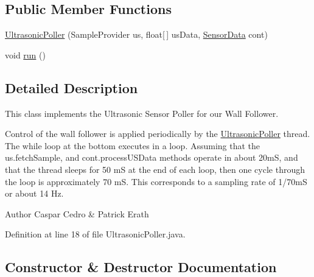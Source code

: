 \subsection*{Public Member Functions}
\begin{DoxyCompactItemize}
\item 
\hyperlink{classca_1_1mcgill_1_1ecse211_1_1sensors_1_1_ultrasonic_poller_a3007841893144cccb37d023f34fb3cfc}{Ultrasonic\+Poller} (Sample\+Provider us, float\mbox{[}$\,$\mbox{]} us\+Data, \hyperlink{classca_1_1mcgill_1_1ecse211_1_1sensors_1_1_sensor_data}{Sensor\+Data} cont)
\item 
void \hyperlink{classca_1_1mcgill_1_1ecse211_1_1sensors_1_1_ultrasonic_poller_acc71fac612a72c197244c71d6cf7b6e1}{run} ()
\end{DoxyCompactItemize}


\subsection{Detailed Description}
This class implements the Ultrasonic Sensor Poller for our Wall Follower.

Control of the wall follower is applied periodically by the \hyperlink{classca_1_1mcgill_1_1ecse211_1_1sensors_1_1_ultrasonic_poller}{Ultrasonic\+Poller} thread. The while loop at the bottom executes in a loop. Assuming that the us.\+fetch\+Sample, and cont.\+process\+U\+S\+Data methods operate in about 20mS, and that the thread sleeps for 50 mS at the end of each loop, then one cycle through the loop is approximately 70 mS. This corresponds to a sampling rate of 1/70mS or about 14 Hz.

\begin{DoxyAuthor}{Author}
Caspar Cedro \& Patrick Erath 
\end{DoxyAuthor}


Definition at line 18 of file Ultrasonic\+Poller.\+java.



\subsection{Constructor \& Destructor Documentation}
\mbox{\label{classca_1_1mcgill_1_1ecse211_1_1sensors_1_1_ultrasonic_poller_a3007841893144cccb37d023f34fb3cfc}} 
